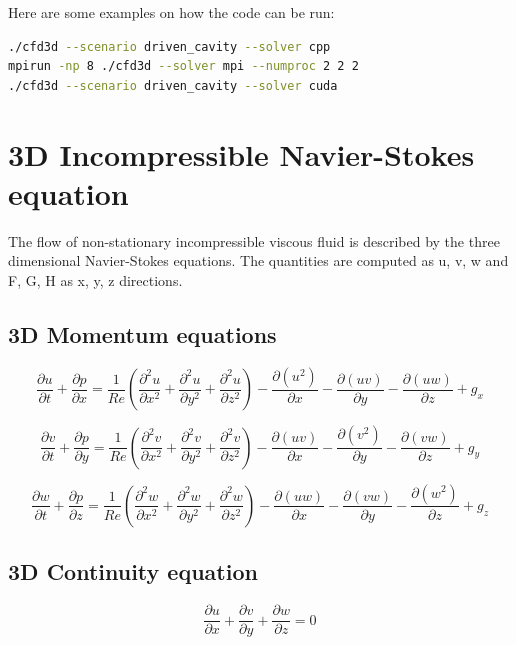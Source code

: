\documentclass{article}%
\begin{document}
Here are some examples on how the code can be run:
\begin{lstlisting}[language=bash, frame=single]
./cfd3d --scenario driven_cavity --solver cpp
mpirun -np 8 ./cfd3d --solver mpi --numproc 2 2 2
./cfd3d --scenario driven_cavity --solver cuda
\end{lstlisting}




\newpage

\section{3D Incompressible Navier-Stokes equation}
The flow of non-stationary incompressible viscous fluid is described by the three dimensional Navier-Stokes equations. The quantities are computed as u, v, w and F, G, H as x, y, z directions.

\subsection{3D Momentum equations}
\begin{equation}
\frac{\partial u}{\partial t} + \frac{\partial p}{\partial x} = 
\frac{1}{Re} \left( \frac{\partial^2 u}{\partial x^2} + \frac{\partial^2 u}{\partial y^2} + \frac{\partial^2 u}{\partial z^2} \right) - 
\frac{\partial(u^2)}{\partial x} -\frac{\partial (uv)}{\partial y} - 
\frac{\partial (uw)}{\partial z} +
g_x 
\end{equation}

\begin{equation}
\frac{\partial v}{\partial t} + \frac{\partial p}{\partial y} = 
\frac{1}{Re} \left( \frac{\partial^2 v}{\partial x^2} + \frac{\partial^2 v}{\partial y^2} + \frac{\partial^2 v}{\partial z^2} \right) - 
\frac{\partial(uv)}{\partial x} -\frac{\partial (v^2)}{\partial y} - 
\frac{\partial (vw)}{\partial z} +
g_y
\end{equation}

\begin{equation}
\frac{\partial w}{\partial t} + \frac{\partial p}{\partial z} = 
\frac{1}{Re} \left( \frac{\partial^2 w}{\partial x^2} + \frac{\partial^2 w}{\partial y^2} + \frac{\partial^2 w}{\partial z^2} \right) - 
\frac{\partial(uw)}{\partial x} -\frac{\partial (vw)}{\partial y} - 
\frac{\partial (w^2)}{\partial z} +
g_z
\end{equation}

\subsection{3D Continuity equation}
\begin{equation}
\frac{\partial u}{\partial x} + \frac{\partial v}{\partial y} + \frac{\partial w}{\partial z} = 0
\end{equation}
\end{document}

